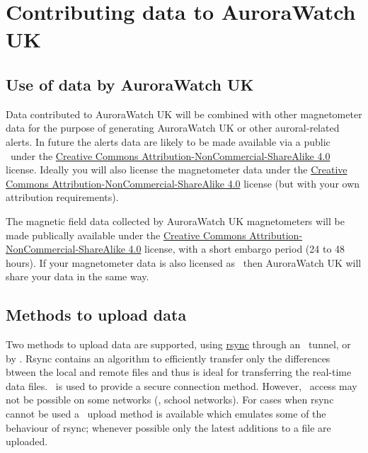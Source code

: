 \chapter{Contributing data to AuroraWatch UK}

\section{Use of data by AuroraWatch UK }

Data contributed to AuroraWatch UK will be combined with other
magnetometer data for the purpose of generating AuroraWatch UK or
other auroral-related alerts. In future the alerts data are likely to
be made available via a public \api\ under the
\href{\ccByNcSaFourUrl}{Creative Commons
  Attribution-NonCommercial-ShareAlike 4.0} license. Ideally you will
also license the magnetometer data under the
\href{\ccByNcSaFourUrl}{Creative Commons
  Attribution-NonCommercial-ShareAlike 4.0} license (but with your own
attribution requirements).


The magnetic field data collected by AuroraWatch UK magnetometers will
be made publically available under the
\href{\ccByNcSaFourUrl}{Creative Commons
  Attribution-NonCommercial-ShareAlike 4.0} license, with a short
embargo period (24 to 48 hours). If your magnetometer data is also
licensed as \ccByNcSaFour\ then AuroraWatch UK will share your data in
the same way.

\section{Methods to upload data}
Two methods to upload data are supported, using
\href{\rsyncUrl}{rsync} through an \ssh\ tunnel, or by \http. Rsync
contains an algorithm to efficiently transfer only the differences
btween the local and remote files and thus is ideal for transferring
the real-time data files. \ssh\ is used to provide a secure connection
method. However, \ssh\ access may not be possible on some networks
(\eg, school networks). For cases when rsync cannot be used a \http\
upload method is available which emulates some of the behaviour of
rsync; whenever possible only the latest additions to a file are
uploaded.

